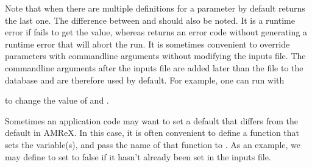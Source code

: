 \documentclass[letterpaper,10pt,english]{sphinxmanual}
\begin{document}
\begin{sphinxVerbatim}[commandchars=\\\{\}]
 
   

   
 
     
\end{sphinxVerbatim}

\sphinxAtStartPar
Note that when there are multiple definitions for a parameter 
by default returns the last one. The difference between  and
 should also be noted. It is a runtime error if  fails to
get the value, whereas  returns an error code without generating a
runtime error that will abort the run.  It is sometimes convenient to
override parameters with command\sphinxhyphen{}line arguments without modifying the inputs
file. The command\sphinxhyphen{}line arguments after the inputs file are added later than the
file to the database and are therefore used by default. For example, one can
run with

\begin{sphinxVerbatim}[commandchars=\\\{\}]
\end{sphinxVerbatim}

\sphinxAtStartPar
to change the value of  and .

\sphinxAtStartPar
Sometimes an application code may want to set a default that differs from the
default in AMReX.  In this case, it is often convenient to define a function that
sets the variable(s), and pass the name of that function to .
As an example, we may define  to set 
to false if it hasn’t already been set in the inputs file.
\end{document}
